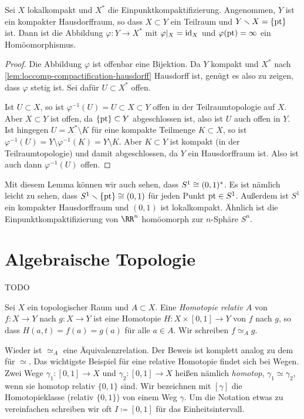 \begin{lemma}
Sei $X$ lokalkompakt und $X^*$ die Einpunktkompaktifizierung. Angenommen, $Y$ ist ein kompakter Hausdorffraum, so dass $X\subset Y$ ein Teilraum und $Y\setminus X = \{\pt\}$ ist. Dann ist die Abbildung $\varphi\colon Y\to X^*$ mit $\varphi|_X = \operatorname{\textnormal{id}}_X$ und $\varphi(\operatorname{\textnormal{pt}}) = \infty$ ein Homöomorphismus.
\end{lemma}
\begin{proof}
Die Abbildung $\varphi$ ist offenbar eine Bijektion. Da $Y$ kompakt und $X^*$ nach \autoref{lem:loccomp-compactification-hausdorff} Hausdorff ist, genügt es also zu zeigen, dass $\varphi$ stetig ist. Sei dafür $U\subset X^*$ offen.

Ist $U\subset X$, so ist $\varphi^{-1}(U) = U\subset X\subset Y$ offen in der Teilraumtopologie auf $X$. Aber $X\subset Y$ ist offen, da $\{\pt\}\subset Y$ abgeschlossen ist, also ist $U$ auch offen in $Y$. Ist hingegen $U = X^*\setminus K$ für eine kompakte Teilmenge $K\subset X$, so ist $\varphi^{-1}(U) = Y\setminus \varphi^{-1}(K) = Y\setminus K$. Aber $K\subset Y$ ist kompakt (in der Teilraumtopologie) und damit abgeschlossen, da $Y$ ein Hausdorffraum ist. Also ist auch dann $\varphi^{-1}(U)$ offen.
\end{proof}

Mit diesem Lemma können wir auch sehen, dass $S^1\cong (0,1)^*$. Es ist nämlich leicht zu sehen, dass $S^1\setminus\{\pt\}\isom (0,1)$ für jeden Punkt $\operatorname{\textnormal{pt}}\in S^1$. Außerdem ist $S^1$ ein kompakter Hausdorffraum und $(0,1)$ ist lokalkompakt. Ähnlich ist die Einpunktkompaktifizierung von $\RR^n$ homöomorph zur $n$-Sphäre $S^n$.

\section{Algebraische Topologie}
TODO

\begin{definition}
Sei $X$ ein topologischer Raum und $A\subset X$. Eine \emph{Homotopie relativ $A$} von $f\colon X\to Y$ nach $g\colon X\to Y$ ist eine Homotopie $H\colon X\times[0,1]\to Y$ von $f$ nach $g$, so dass $H(a,t) = f(a) = g(a)$ für alle $a\in A$. Wir schreiben $f\simeq_A g$.
\end{definition}

Wieder ist $\simeq_A$ eine Äquivalenzrelation. Der Beweis ist komplett analog zu dem für $\simeq$. Das wichtigste Beispiel für eine relative Homotopie findet sich bei Wegen. Zwei Wege $\gamma_1\colon [0,1]\to X$ und $\gamma_2\colon[0,1]\to X$ heißen nämlich \emph{homotop}, $\gamma_1\simeq\gamma_2$, wenn sie homotop relativ $\{0,1\}$ sind. Wir bezeichnen mit $[\gamma]$ die Homotopieklasse (relativ $\{0,1\}$) von einem Weg $\gamma$. Um die Notation etwas zu vereinfachen schreiben wir oft $I\coloneqq [0,1]$ für das Einheitsintervall.

